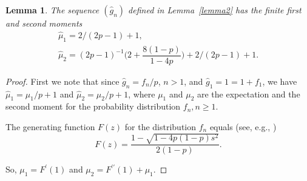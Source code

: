 \documentclass[numbers,compress,v1.0.1]{vmsta}
\newtheorem{lemma}{Lemma}
\theoremstyle{definition}
\begin{document}
\begin{lemma}\label{lemma3}
The sequence $(\hat g_n)$ defined in Lemma~\ref{lemma2} has the finite
first and second moments
%
\begin{equation}
%
\begin{array}{c}
\hat\mu_1 = 2/(2p-1) + 1 ,\\[3pt]
\hat\mu_2 = (2p-1)^{-1} \biggl( 2 + \dfrac{8(1-p)}{1-4p} \biggr) + 2/(2p-1) + 1.
\end{array} %
\end{equation}
%
\end{lemma}

\begin{proof}
First we note that since $\hat g_n = f_n/p$, $n>1$, and $\hat g_1 = 1
= 1+f_1$, we have $\hat\mu_1 = \mu_1/p +1$ and $\hat\mu_2 = \mu_{2}/p
+1$, where
$\mu_1$ and $\mu_2$ are the expectation and the second moment for the
probability distribution $f_n, n\ge1$.

The generating function $F(z)$ for the distribution $f_n$ equals
(see, e.g., \cite[Ch.~XIII]{Feller})
%
\begin{equation}
F(z) = \frac{1-\sqrt{1-4p(1-p)s^2}}{2(1-p)}.
\end{equation}

So, $ \mu_1 = F^\prime(1)$ and $\mu_2 = F^{\prime\prime}(1) + \mu_1$.
\end{proof}

\appendix
\end{document}
